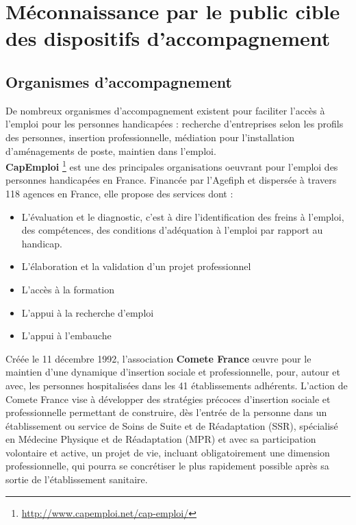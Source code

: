 \section{Méconnaissance par le public cible des dispositifs d'accompagnement}

\subsection{Organismes d'accompagnement}
De nombreux organismes d'accompagnement existent pour faciliter l'accès à l'emploi pour les personnes handicapées : recherche d'entreprises selon les profils des personnes, insertion professionnelle, médiation pour l'installation d'aménagements de poste, maintien dans l'emploi.\\

\textbf{CapEmploi} \footnote{\url{http://www.capemploi.net/cap-emploi/}} est une des principales organisations oeuvrant pour l'emploi des personnes handicapées en France. Financée par l'Agefiph et dispersée à travers 118 agences en France, elle propose des services dont :
\begin{itemize}
\item L'évaluation et le diagnostic, c'est à dire l'identification des freins à l'emploi, des compétences, des conditions d'adéquation à l'emploi par rapport au handicap.
\item L'élaboration et la validation d'un projet professionnel
\item L'accès à la formation
\item L'appui à la recherche d'emploi
\item L'appui à l'embauche\\
\end{itemize}

Créée le 11 décembre 1992, l'association \textbf{Comete France} œuvre pour le maintien d'une dynamique d'insertion sociale et professionnelle, pour, autour et avec, les personnes hospitalisées dans les 41 établissements adhérents. L'action de Comete France vise à développer des stratégies précoces d'insertion sociale et professionnelle permettant de construire, dès l'entrée de la personne dans un établissement ou service de Soins de Suite et de Réadaptation (SSR), spécialisé en Médecine Physique et de Réadaptation (MPR) et avec sa participation volontaire et active, un projet de vie, incluant obligatoirement une dimension professionnelle, qui pourra se concrétiser le plus rapidement possible après sa sortie de l’établissement sanitaire.

